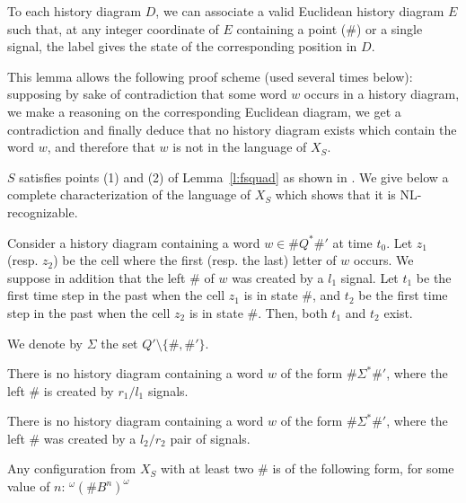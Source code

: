 \documentclass{jac}
\theoremstyle{definition}
\begin{document}
\begin{lem}
  \label{euclidean}
  To each history diagram $D$, we can associate a valid Euclidean history
  diagram $E$ such that, at any integer coordinate of $E$ containing a point
  ($\#$) or a single signal, the label gives the state of the corresponding
  position in $D$.
\end{lem}

This lemma allows the following proof scheme (used several times below):
supposing by sake of contradiction that some word $w$ occurs in a history
diagram, we make a reasoning on the corresponding Euclidean diagram, we get a
contradiction and finally deduce that no history diagram exists which contain
the word $w$, and therefore that $w$ is not in the language of $X_S$.

$S$ satisfies points (1) and (2) of Lemma~\ref{l:fsquad} as shown in
\cite[Prop. 4.3]{rice}. We give below a complete characterization of
the language of $X_S$ which shows that it is NL-recognizable.

\begin{lemma}
\label{columns-lemma}
Consider a history diagram containing a word $w\in\#Q^*\#'$ at time $t_0$. Let
$z_1$ (resp. $z_2$) be the cell where the first (resp. the last) letter of $w$
occurs. We suppose in addition that the left $\#$ of $w$ was created by a $l_1$
signal. Let $t_1$ be the first time step in the past when the cell $z_1$ is in
state $\#$, and $t_2$ be the first time step in the past when the cell $z_2$ is
in state $\#$. Then, both $t_1$ and $t_2$ exist.

\end{lemma}

We denote by $\Sigma$ the set ${Q'\setminus\{\#,\#'\}}$.

\begin{lemma}
  \label{l1r1-prop}
  There is no history diagram containing a word $w$ of the form $\#\Sigma^*\#'$,
  where the left $\#$ is created by $r_1/l_1$ signals.
\end{lemma}



\begin{lemma}
  \label{l2r2-prop}
  There is no history diagram containing a word $w$ of the form $\#\Sigma^*\#'$,
  where the left $\#$ was created by a $l_2/r_2$ pair of signals.
\end{lemma}

\begin{lemma}
  \label{periodic-prop}
  Any configuration from $X_S$ with at least two $\#$ is of the following form,
  for some value of $n$: ${^\omega(\#B^n)^\omega}$
\end{lemma}
\end{document}
